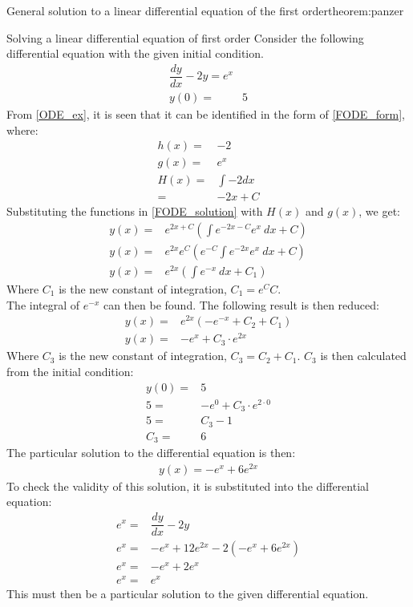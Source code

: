 \begin{theorem}{General solution to a linear differential equation of the first order}{theorem:panzer}
\begin{example}{Solving a linear differential equation of first order}{}
Consider the following differential equation with the given initial condition.
\begin{align}
	\dfrac{dy}{dx}-2y=e^x  \label{ODE_ex}\\ 
	y(0) =& 5 \nonumber
\end{align}
From \eqref{ODE_ex}, it is seen that it can be identified in the form of \eqref{FODE_form}, where:
\begin{align*}
	h(x) =& -2 \\
	g(x) =& e^x \\
	H(x) =& \int{-2 dx} \\
	     =& -2x + C
\end{align*}
Substituting the functions in \eqref{FODE_solution} with $H(x)$ and $g(x)$, we get: 
\begin{align*}
	y(x)=&e^{2x+C}(\int{e^{-2x-C}e^x\ dx}+C) \\
	y(x)=&e^{2x}e^{C}(e^{-C}\int{e^{-2x}e^{x}\ dx}+C) \\
	y(x)=&e^{2x}(\int{e^{-x}\ dx}+C_{1})
\end{align*}
Where $C_{1}$ is the new constant of integration, $C_1=e^{C}C$. \\
The integral of $e^{-x}$ can then be found. The following result is then reduced:
\begin{align*}
	y(x)=&e^{2x}(-e^{-x}+C_{2}+C_{1}) \\
	y(x)=&-e^x+C_{3} \cdot e^{2x}
\end{align*}
Where $C_{3}$ is the new constant of integration, $C_{3}=C_{2}+C_{1}$. $C_{3}$ is then calculated from the initial condition:
\begin{align*}
	y(0)=&5 \\
	5=&-e^0+C_{3} \cdot e^{2 \cdot 0} \\
	5 =& C_{3}-1 \\
	C_{3} =& 6
\end{align*}
The particular solution to the differential equation is then:
\begin{align*}
	y(x) = -e^x+6e^{2x}
\end{align*}
To check the validity of this solution, it is substituted into the differential equation:
\begin{align*}
	e^x =& \dfrac{dy}{dx} -2y \\
	e^x =& -e^x+12e^{2x} -2(-e^x+6e^{2x})  \\
	e^x =& -e^x+2e^x  \\
	e^x =& e^x
\end{align*}
This must then be a particular solution to the given differential equation.
\end{example}


\end{theorem}
